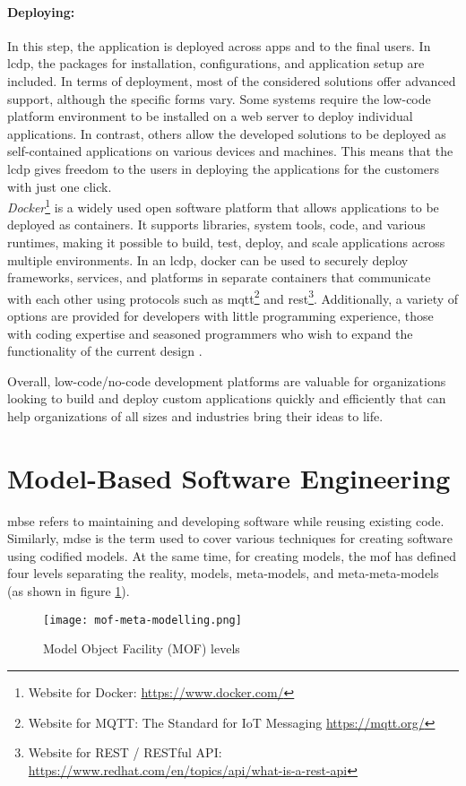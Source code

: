 \paragraph{Deploying:}
In this step, the application is deployed across apps and to the final users.
In \ac{lcdp}, the packages for installation, configurations, and application setup are included.
In terms of deployment, most of the considered solutions offer advanced support, although the specific forms vary. 
Some systems require the low-code platform environment to be installed on a web server to deploy individual applications. 
In contrast, others allow the developed solutions to be deployed as self-contained applications on various devices and machines.
This means that the \ac{lcdp} gives freedom to the users in deploying the applications for the customers with just one click. \\
\textit{Docker}\footnote{Website for Docker: \url{https://www.docker.com/}} is a widely used open software platform that allows applications to be deployed as containers. 
It supports libraries, system tools, code, and various runtimes, making it possible to build, test, deploy, and scale applications across multiple environments. 
In an \ac{lcdp}, docker can be used to securely deploy frameworks, services, and platforms in separate containers that communicate with each other using protocols such as \ac{mqtt}\footnote{Website for MQTT: The Standard for IoT Messaging \url{https://mqtt.org/}} and \ac{rest}\footnote{Website for REST / RESTful API: \url{https://www.redhat.com/en/topics/api/what-is-a-rest-api}}.
Additionally, a variety of options are provided for developers with little programming experience, those with coding expertise and seasoned programmers who wish to expand the functionality of the current design \cite{article:nocode:sahina}.

Overall, low-code/no-code development platforms are valuable for organizations looking to build and deploy custom applications quickly and efficiently that can help organizations of all sizes and industries bring their ideas to life.
\clearpage
\section{Model-Based Software Engineering}
\label{background:section:mbse}
\ac{mbse} refers to maintaining and developing software while reusing existing code.
Similarly, \ac{mdse} is the term used to cover various techniques for creating software using codified models.
At the same time, for creating models, the \ac{mof} has defined four levels separating the reality, models, meta-models, and meta-meta-models (as shown in figure \ref{fig:background:moflevels}).
\begin{figure}[htbp!]
  \centering    
  \texttt{[image: mof-meta-modelling.png]}
  \caption[MOF Levels]{Model Object Facility (MOF) levels}
  \label{fig:background:moflevels}
\end{figure}

